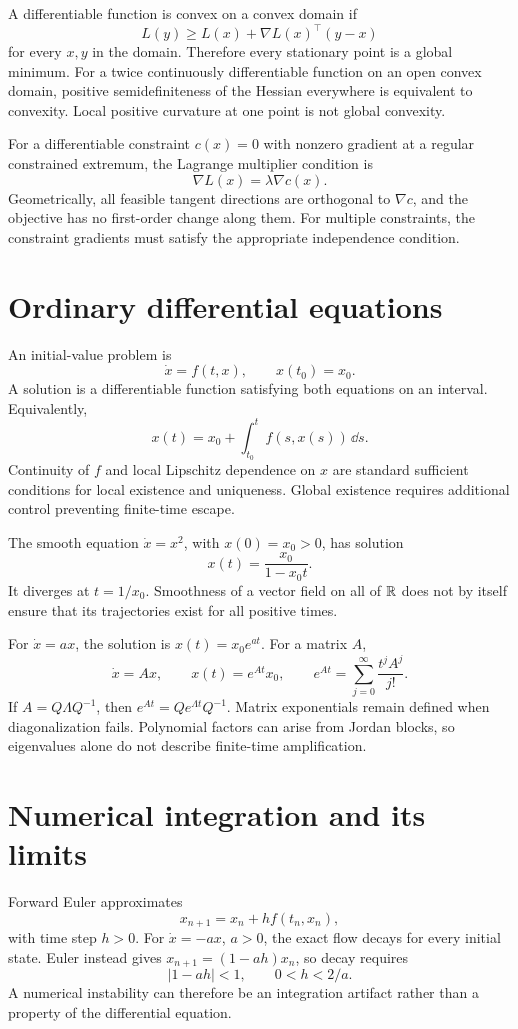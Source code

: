 A differentiable function is convex on a convex domain if
\[
L(y)\geq L(x)+\nabla L(x)^\top(y-x)
\]
for every \(x,y\) in the domain. Therefore every stationary point is a global minimum. For a twice continuously differentiable function on an open convex domain, positive semidefiniteness of the Hessian everywhere is equivalent to convexity. Local positive curvature at one point is not global convexity.

For a differentiable constraint \(c(x)=0\) with nonzero gradient at a regular constrained extremum, the Lagrange multiplier condition is
\[
\nabla L(x)=\lambda\nabla c(x).
\]
Geometrically, all feasible tangent directions are orthogonal to \(\nabla c\), and the objective has no first-order change along them. For multiple constraints, the constraint gradients must satisfy the appropriate independence condition.

\section{Ordinary differential equations}
An initial-value problem is
\[
\dot x=f(t,x),\qquad x(t_0)=x_0.
\]
A solution is a differentiable function satisfying both equations on an interval. Equivalently,
\[
x(t)=x_0+\int_{t_0}^t f(s,x(s))\,\dd s.
\]
Continuity of \(f\) and local Lipschitz dependence on \(x\) are standard sufficient conditions for local existence and uniqueness. Global existence requires additional control preventing finite-time escape.

\begin{example}
The smooth equation \(\dot x=x^2\), with \(x(0)=x_0>0\), has solution
\[
x(t)=\frac{x_0}{1-x_0t}.
\]
It diverges at \(t=1/x_0\). Smoothness of a vector field on all of \(\mathbb{R}\) does not by itself ensure that its trajectories exist for all positive times.
\end{example}

For \(\dot x=ax\), the solution is \(x(t)=x_0e^{at}\). For a matrix \(A\),
\[
\dot x=Ax,\qquad x(t)=e^{At}x_0,\qquad
e^{At}=\sum_{j=0}^{\infty}\frac{t^jA^j}{j!}.
\]
If \(A=Q\Lambda Q^{-1}\), then \(e^{At}=Qe^{\Lambda t}Q^{-1}\). Matrix exponentials remain defined when diagonalization fails. Polynomial factors can arise from Jordan blocks, so eigenvalues alone do not describe finite-time amplification.

\section{Numerical integration and its limits}
Forward Euler approximates
\[
x_{n+1}=x_n+h f(t_n,x_n),
\]
with time step \(h>0\). For \(\dot x=-ax\), \(a>0\), the exact flow decays for every initial state. Euler instead gives \(x_{n+1}=(1-ah)x_n\), so decay requires
\[
|1-ah|<1,\qquad 0<h<2/a.
\]
A numerical instability can therefore be an integration artifact rather than a property of the differential equation.

